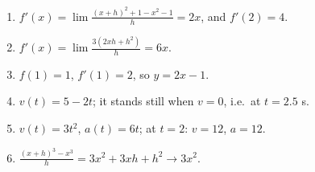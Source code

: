 \begin{enumerate}[label=\textbf{\ansnum.\arabic*}]
  \item $f'(x)=\lim\frac{(x+h)^2+1-x^2-1}{h}=2x$, and $f'(2)=4$.
  \item $f'(x)=\lim\frac{3(2xh+h^2)}{h}=6x$.
  \item $f(1)=1$, $f'(1)=2$, so $y=2x-1$.
  \item $v(t)=5-2t$; it stands still when $v=0$, i.e.\ at $t=2.5$ s.
  \item $v(t)=3t^2$, $a(t)=6t$; at $t=2$: $v=12$, $a=12$.
  \item[\textbf{2.6}] $\frac{(x+h)^3-x^3}{h}=3x^2+3xh+h^2\to3x^2$.
\end{enumerate}
